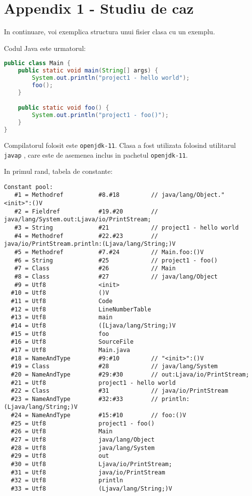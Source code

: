 \section{Appendix 1 - Studiu de caz}

In continuare, voi exemplica structura unui fisier clasa cu un exemplu.

Codul Java este urmatorul:

\begin{lstlisting}[language=Java]
public class Main {
    public static void main(String[] args) {
        System.out.println("project1 - hello world");
        foo();
    }

    public static void foo() {
        System.out.println("project1 - foo()");
    }
}
\end{lstlisting}

Compilatorul folosit este \texttt{openjdk-11}. Clasa a fost utilizata
folosind utilitarul \texttt{javap} \cite{javap}, care este de asemenea inclus
in pachetul \texttt{openjdk-11}.

In primul rand, tabela de constante:

\begin{lstlisting}
Constant pool:
   #1 = Methodref          #8.#18         // java/lang/Object."<init>":()V
   #2 = Fieldref           #19.#20        // java/lang/System.out:Ljava/io/PrintStream;
   #3 = String             #21            // project1 - hello world
   #4 = Methodref          #22.#23        // java/io/PrintStream.println:(Ljava/lang/String;)V
   #5 = Methodref          #7.#24         // Main.foo:()V
   #6 = String             #25            // project1 - foo()
   #7 = Class              #26            // Main
   #8 = Class              #27            // java/lang/Object
   #9 = Utf8               <init>
  #10 = Utf8               ()V
  #11 = Utf8               Code
  #12 = Utf8               LineNumberTable
  #13 = Utf8               main
  #14 = Utf8               ([Ljava/lang/String;)V
  #15 = Utf8               foo
  #16 = Utf8               SourceFile
  #17 = Utf8               Main.java
  #18 = NameAndType        #9:#10         // "<init>":()V
  #19 = Class              #28            // java/lang/System
  #20 = NameAndType        #29:#30        // out:Ljava/io/PrintStream;
  #21 = Utf8               project1 - hello world
  #22 = Class              #31            // java/io/PrintStream
  #23 = NameAndType        #32:#33        // println:(Ljava/lang/String;)V
  #24 = NameAndType        #15:#10        // foo:()V
  #25 = Utf8               project1 - foo()
  #26 = Utf8               Main
  #27 = Utf8               java/lang/Object
  #28 = Utf8               java/lang/System
  #29 = Utf8               out
  #30 = Utf8               Ljava/io/PrintStream;
  #31 = Utf8               java/io/PrintStream
  #32 = Utf8               println
  #33 = Utf8               (Ljava/lang/String;)V
\end{lstlisting}

